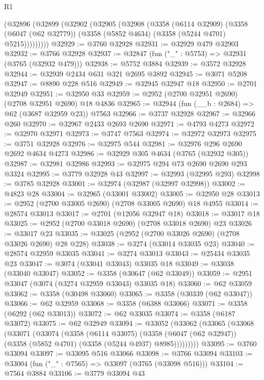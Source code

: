 \begin{lexlean}{R1}
\begin{coremodule}
    (@32896
      (@32899
        (@32902
          (@32905
            (@32908
              (@3358
                (@6114 @32909)
                (@3358 (@6047 (@62 @32779)) (@3358 (@5852 @4634) (@3358 (@5244 @4701) @5215)))))))))
@32929 := @3760 @32928
@32931 := @32929 @479 @32903
@32932 := @3766 @32928
@32937 := @32847 (fun ("_" : @5753) => @32931 (@3765 (@32932 @479)))
@32938 := @5752 @3884
@32939 := @3572 @32928
@32944 := @32939 @2434 @631 @321 @2695 @3892
@32945 := @3071 @5208
@32947 := @8890 @228 @516
@32949 := @32945 @32947 @18
@32950 := @2701 @32949
@32951 := @32950 @33
@32959 := @2952 (@2700 @32951 @2690) (@2708 @32951 @2690) @18 @4836
@32965 := @32944 (fun (__b : @2684) => @62 (@3687 @32959 @23)) @7563
@32966 := @3737 @32928
@32967 := @32966 @260
@32970 := @32967 @2433 @2693 @2690
@32971 := @4793 @4273
@32972 := @32970 @32971
@32973 := @3747 @7563
@32974 := @32972 @32973
@32975 := @3751 @32928
@32976 := @32975 @544
@32981 := @32976 @296 @2690 @2692 @4634 @4273
@32986 := @32929 @305 @4634 (@3765 (@32932 @305))
@32987 := @32981 @32986
@32993 := @32975 @294 @73 @2690 @2690 @293 @3324
@32995 := @3779 @32928 @43
@32997 := @32993 (@32995 @293)
@32998 := @3785 @32928
@33001 := @32974 (@32987 (@32997 @32998))
@33002 := @4823 @28
@33004 := @32965 (@33001 @33002)
@33005 := @32950 @28
@33013 := @2952 (@2700 @33005 @2690) (@2708 @33005 @2690) @18 @4955
@33014 := @28574 @33013
@33017 := @2701 (@12056 @32947 @18)
@33018 := @33017 @18
@33025 := @2952 (@2700 @33018 @2690) (@2708 @33018 @2690) @23
@33026 := @33017 @23
@33035 := @33025 (@2952 (@2700 @33026 @2690) (@2708 @33026 @2690) @28 @228)
@33038 := @3274 (@33014 @33035 @23)
@33040 := @28574 @32959 @33035
@33041 := @3274 @33013
@33043 := @25434 @33035 @23
@33047 := @3074 (@33041 @33043) @33035 @18
@33049 := @33038 (@33040 @33047)
@33052 := @3358 (@30647 (@62 @33049))
@33059 := @2951 @33047 (@3074 (@3274 @32959 @33043) @33035 @18)
@33060 := @62 @33059
@33062 := @3358 (@30498 @33060)
@33065 := @3358 (@30339 (@62 @33047))
@33066 := @62 @32959
@33068 := @3358 (@6388 @33066)
@33071 := @3358 (@6292 (@62 @33013))
@33072 := @62 @33035
@33074 := @3358 (@6187 @33072)
@33075 := @62 @32949
@33094 := @33052
    (@33062
      (@33065
        (@33068
          (@33071
            (@33074
              (@3358
                (@6114 @33075)
                (@3358 (@6047 (@62 @32947)) (@3358 (@5852 @4701) (@3358 (@5244 @4937) @8985)))))))))
@33095 := @3760 @33094
@33097 := @33095 @516 @33066
@33098 := @3766 @33094
@33103 := @33004 (fun ("_" : @7565) => @33097 (@3765 (@33098 @516)))
@33104 := @7564 @3884
@33106 := @3779 @33094 @43

\end{coremodule}
\end{lexlean}
